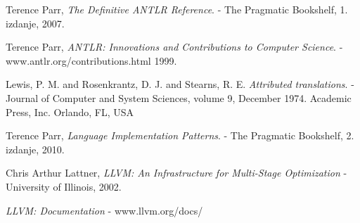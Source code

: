 \begin{thebibliography}{9}

	Terence Parr,
	\emph{The Definitive ANTLR Reference}.
	- The Pragmatic Bookshelf,
	1. izdanje,
	2007.
   
	Terence Parr,
	\emph{ANTLR: Innovations and Contributions to Computer Science}.
	- www.antlr.org/contributions.html
	1999.

	Lewis, P. M. and Rosenkrantz, D. J. and Stearns, R. E.
	\emph{Attributed translations}.
	- Journal of Computer and System Sciences, 
	volume 9,
	December 1974.
	Academic Press, Inc. Orlando, FL, USA

	Terence Parr,
	\emph{Language Implementation Patterns}.
	- The Pragmatic Bookshelf,
	2. izdanje,
	2010.

	Chris Arthur Lattner,
	\emph{LLVM: An Infrastructure for Multi-Stage Optimization}
	- University of Illinois, 2002.
	
	\emph{LLVM: Documentation}
	- www.llvm.org/docs/
	

\end{thebibliography}